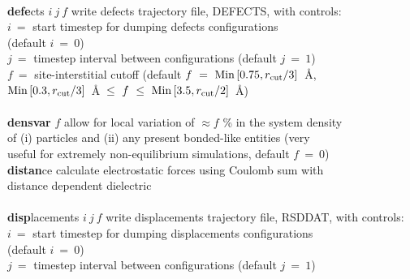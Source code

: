 \begin{tabbing}
\>                                              \> \\
\> {\bf defe}cts $i~j~f$                        \> write defects trajectory file, DEFECTS, with controls: \\
\>                                              \> $i~=$ start timestep for dumping defects configurations \\
\>                                              \> \phantom{xxx} (default $i~=~0$) \\
\>                                              \> $j~=$ timestep interval between configurations (default $j~=~1$) \\
\>                                              \> $f~=$ site-interstitial cutoff (default $f~=~{\rm Min}\left[0.75,r_{\rm cut}/3\right]$~\AA, \\
\>                                              \> ${\rm Min}\left[0.3,r_{\rm cut}/3\right]$~\AA~$\le~f~\le~{\rm Min}\left[3.5,r_{\rm cut}/2\right]$~\AA) \\
\>                                              \> \\
\> {\bf densvar} $f$                            \> allow for local variation of $\approx f$ \% in the system density \\
\>                                              \> of (i) particles and (ii) any present bonded-like entities (very \\
\>                                              \> useful for extremely non-equilibrium simulations, default $f~=~0$) \\
\> {\bf distan}ce                               \> calculate electrostatic forces using Coulomb sum with \\
\>                                              \> distance dependent dielectric \\
\>                                              \> \\
\> {\bf disp}lacements $i~j~f$                  \> write displacements trajectory file, RSDDAT, with controls: \\
\>                                              \> $i~=$ start timestep for dumping displacements configurations \\
\>                                              \> \phantom{xxx} (default $i~=~0$) \\
\>                                              \> $j~=$ timestep interval between configurations (default $j~=~1$) \\

\end{tabbing}
